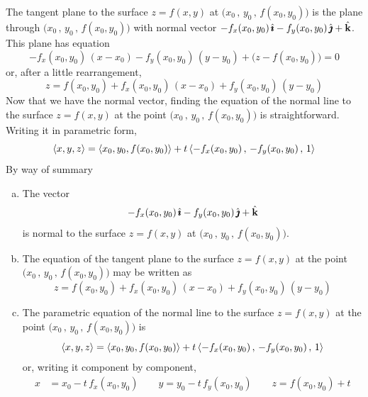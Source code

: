 The tangent plane to the surface $z=f(x,y)$ at $\big(x_0\,,\,y_0\,,\,f(x_0,y_0)\big)$
is the plane through $\big(x_0\,,\,y_0\,,\,f(x_0,y_0)\big)$ with normal vector
$-f_x(x_0,y_0)\,\hat{\pmb{\imath}} - f_y(x_0,y_0)\,\hat{\pmb{\jmath}} +\hat{\mathbf{k}}$. This plane has equation
\begin{equation*}
-f_x(x_0,y_0)\,(x-x_0) - f_y(x_0,y_0)\,(y-y_0) +\big(z-f(x_0,y_0)\big) =0
\end{equation*}
or, after a little rearrangement,
$$
z = f(x_0,y_0) + f_x(x_0,y_0)\,(x-x_0) + f_y(x_0,y_0)\,(y-y_0)
$$
Now that we have the normal vector, finding the equation of the normal line
to the surface $z=f(x,y)$ at the point $\big(x_0\,,\,y_0\,,\,f(x_0,y_0)\big)$ 
is straightforward. Writing it in parametric form,
$$
\left< x,y,z \right> =  \left< x_0,y_0,f(x_0,y_0) \right>
                 +t\left< -f_x(x_0,y_0)\,,\, - f_y(x_0,y_0)\,,\, 1 \right>
$$
By way of summary
\begin{theorem}\label{thm tan plane f}
\begin{enumerate}[(a)]
\item The vector
$$
-f_x(x_0,y_0)\,\hat{\pmb{\imath}} - f_y(x_0,y_0)\,\hat{\pmb{\jmath}} +\hat{\mathbf{k}}
$$
is normal to the surface $z=f(x,y)$ at  $\big(x_0\,,\,y_0\,,\,f(x_0,y_0)\big)$.

\item
The equation of the tangent plane to the surface $z=f(x,y)$ 
at the point $\big(x_0\,,\,y_0\,,\,f(x_0,y_0)\big)$ may be written as
$$
z = f(x_0,y_0) + f_x(x_0,y_0)\,(x-x_0) + f_y(x_0,y_0)\,(y-y_0)
$$

\item
The parametric equation of the normal line to the surface $z=f(x,y)$ 
at the point $\big(x_0\,,\,y_0\,,\,f(x_0,y_0)\big)$ is
$$
\left< x,y,z \right> =  \left< x_0,y_0,f(x_0,y_0) \right>
                 +t\left< -f_x(x_0,y_0)\,,\, - f_y(x_0,y_0)\,,\, 1 \right>
$$
or, writing it component by component,
\begin{align*}
x&= x_0 - t\,f_x(x_0,y_0) \qquad
y= y_0 - t\,f_y(x_0,y_0) \qquad
z= f(x_0,y_0) + t
\end{align*}
\end{enumerate}
\end{theorem}

